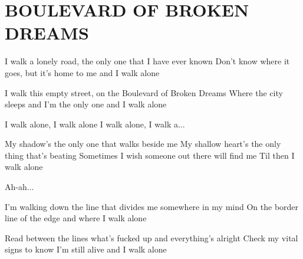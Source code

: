 \documentclass[../../../songbook.tex]{subfiles}
\begin{document}
\TabPositions{9cm} %
\section*{BOULEVARD OF BROKEN DREAMS}
{}
\vspace{0.5cm}
I walk a lonely road, the only one that I have ever known		  \newline
Don't know where it goes, but it's home to me and I walk alone	 \newline

I walk this empty street, on the Boulevard of Broken Dreams				 \newline
Where the city sleeps and I'm the only one and I walk alone				 \newline

I walk alone, I walk alone	  \newline
I walk alone, I walk a...		  \newline

\-\hspace{1cm} My shadow's the only one that walks beside me	\newline
\-\hspace{1cm} My shallow heart's the only thing that's beating	\newline
\-\hspace{1cm} Sometimes I wish someone out there will find me	\newline
\-\hspace{1cm} Til then I walk alone							\newline

Ah-ah...				 \newline

I'm walking down the line that divides me somewhere in my mind				 \newline
On the border line of the edge and where I walk alone				 \newline

Read between the lines what's fucked up and everything's alright				 \newline
Check my vital signs to know I'm still alive and I walk alone				 \newline
\end{document}
